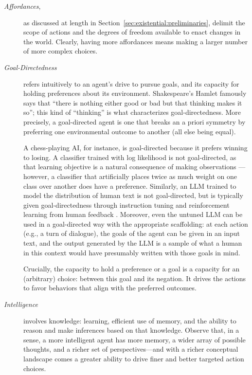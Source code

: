\begin{description}
    \item [\emph{Affordances},] as discussed at length in Section~\ref{sec:existential:preliminaries}, delimit the scope of actions and the degrees of freedom available to enact changes in the world.  
    Clearly, having more affordances means making a larger number of more complex choices. 
    
    \item [\emph{Goal-Directedness}] refers intuitively to an agent's drive to pursue goals, and its capacity for holding preferences about its environment. 
    Shakespeare's Hamlet famously says that ``there is nothing either good or bad but that thinking makes it so''; this kind of ``thinking'' is what characterizes goal-directedness.
    More precisely, a goal-directed agent is one that breaks an a priori symmetry by preferring one environmental outcome to another (all else being equal). 

    A chess-playing AI, for instance, is goal-directed because it prefers winning to losing. A classifier trained with log likelihood is not goal-directed, as that learning objective is a natural consequence of making observations \cite{richardson.one-true-loss}---however, a classifier that artificially places twice as much weight on one class over another does have a preference.
    Similarly, an LLM trained to model the distribution of human text is not goal-directed, but is typically given goal-directedness through instruction tuning and reinforcement learning from human feedback \cite{proceedings.neurips.cc.paper.files.paper.2022.file.b1efde53be364a73914f58805a001731.Paper.Conference.pdf}. Moreover, even the untuned LLM can be used in a goal-directed way with the appropriate scaffolding: at each action (e.g., a turn of dialogue), the goals of the agent can be given in an input text, and the output generated by the LLM is a sample of what a human in this context would have presumably written with those goals in mind.
    
    Crucially, the capacity to hold a preference or a goal is a capacity for an (arbitrary) choice: between this goal and its negation.
    It drives the actions to favor behaviors that align with the preferred outcomes.

    \item [\emph{Intelligence}] involves knowledge: learning, efficient use of memory, and the ability to reason and make inferences based on that knowledge.  
    Observe that, in a sense, a more intelligent agent has more memory, a wider array of possible thoughts, and a richer set of perspectives---and with a richer conceptual landscape comes a greater ability to drive finer and better targeted action choices. 
\end{description}

